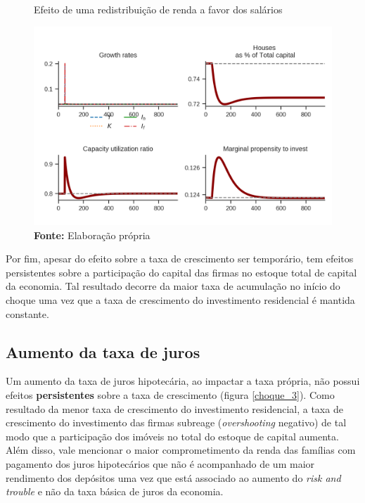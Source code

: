 \begin{figure}[htb]
	\centering
	\caption{Efeito de uma redistribuição de renda a favor dos salários}
	\label{choque_2}
	\includegraphics{../../Modelo/Versoes/Shock_2.png}
	\caption*{\textbf{Fonte:} Elaboração própria}
\end{figure}

Por fim, apesar do efeito sobre a taxa de crescimento ser temporário, tem efeitos persistentes sobre a participação do capital das firmas no estoque total de capital da economia. Tal resultado decorre da maior taxa de acumulação no início do choque uma vez que a taxa de crescimento do investimento residencial é mantida constante. 

\subsection*{Aumento da taxa de juros}

Um aumento da taxa de juros hipotecária, ao impactar a taxa própria, não possui efeitos \textbf{persistentes} sobre a taxa de crescimento (figura \ref{choque_3}). Como resultado da menor taxa de crescimento do investimento residencial, a taxa de crescimento do investimento das firmas subreage (\textit{overshooting} negativo) de tal modo que a participação dos imóveis no total do estoque de capital aumenta. Além disso, vale mencionar o maior comprometimento da renda das famílias com pagamento dos juros hipotecários que não é acompanhado de um maior rendimento dos depósitos uma vez que está associado ao aumento do \textit{risk and trouble} e não da taxa básica de juros da economia.

